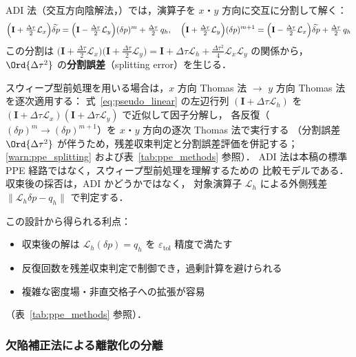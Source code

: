 ADI 法（交互方向陰解法，\cite{PeacemanRachford1955}）では，演算子を $x$・$y$ 方向に交互に分割して解く：
\begin{equation}
  \Bigl(\mathbf{I} + \tfrac{\Delta\tau}{2}\mathcal{L}_x\Bigr)\widetilde{\delta p}
  = \Bigl(\mathbf{I} - \tfrac{\Delta\tau}{2}\mathcal{L}_y\Bigr)(\delta p)^m + \tfrac{\Delta\tau}{2}\, q_h,
  \quad
  \Bigl(\mathbf{I} + \tfrac{\Delta\tau}{2}\mathcal{L}_y\Bigr)(\delta p)^{m+1}
  = \Bigl(\mathbf{I} - \tfrac{\Delta\tau}{2}\mathcal{L}_x\Bigr)\widetilde{\delta p} + \tfrac{\Delta\tau}{2}\, q_h
  \label{eq:ADI}
\end{equation}
この分割は
$
  \bigl(\mathbf{I}+\tfrac{\Delta\tau}{2}\mathcal{L}_x\bigr)
  \bigl(\mathbf{I}+\tfrac{\Delta\tau}{2}\mathcal{L}_y\bigr)
  = \mathbf{I} + \Delta\tau\mathcal{L}_h + \tfrac{\Delta\tau^2}{4}\mathcal{L}_x\mathcal{L}_y
$
の関係から，$\Ord{\Delta\tau^2}$ の\textbf{分割誤差}（splitting error）を生じる．

スウィープ型前処理を用いる場合は，$x$ 方向 Thomas 法 $\to$ $y$ 方向 Thomas 法を逐次適用する：
式~\eqref{eq:pseudo_linear} の左辺行列 $(\mathbf{I}+\Delta\tau\mathcal{L}_h)$ を
$(\mathbf{I}+\Delta\tau\mathcal{L}_x)(\mathbf{I}+\Delta\tau\mathcal{L}_y)$ で近似して因子分解し，
各反復（$(\delta p)^m \to (\delta p)^{m+1}$）を $x$・$y$ 方向の逐次 Thomas 法で実行する
（分割誤差 $\Ord{\Delta\tau^2}$ が伴うため，残差収束判定と分割誤差評価を併記する；
\ref{warn:ppe_splitting} および表~\ref{tab:ppe_methods} 参照）．
ADI 法は本稿の標準 PPE 経路ではなく，スウィープ型前処理を理解するための
比較モデルである．収束後の採否は，ADI かどうかではなく，
対象演算子 $\mathcal{L}_h$ による外側残差
$\|\mathcal{L}_h\delta p-q_h\|$ で判定する．

この設計から得られる利点：

\begin{itemize}
  \item 収束後の解は $\mathcal{L}_h(\delta p) = q_h$ を $\varepsilon_\text{tol}$ 精度で満たす
  \item 反復回数を残差収束判定で制御でき，過剰計算を避けられる
  \item 複雑な密度場・非直交格子への拡張が容易
\end{itemize}

（表~\ref{tab:ppe_methods} 参照）．

\subsubsection{欠陥補正法による離散化の分離}
\label{sec:defect_correction}

